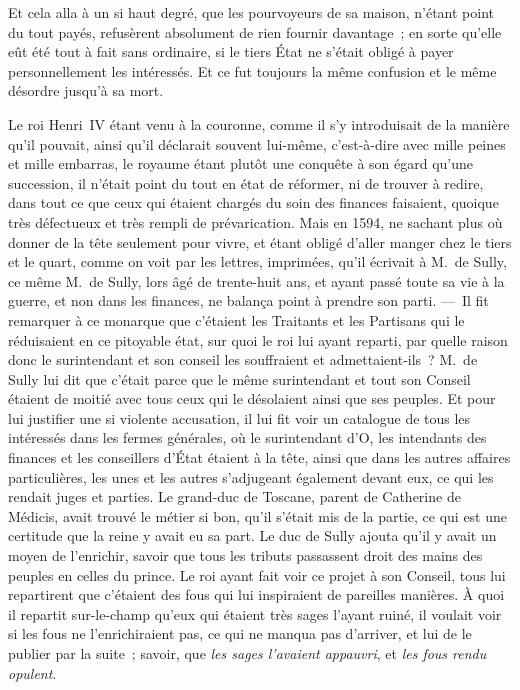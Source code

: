 \documentclass[french,twoside]{book} %
\begin{document}
Et cela alla à un si haut degré, que les pourvoyeurs de sa maison, n’étant point du tout payés, refusèrent absolument de rien fournir davantage ; en sorte qu’elle eût été tout à fait sans ordinaire, si le tiers État ne s’était obligé à payer personnellement les intéressés. Et ce fut toujours la même confusion et le même désordre jusqu’à sa mort.\par
Le roi Henri IV étant venu à la couronne, comme il s’y introduisait de la manière qu’il pouvait, ainsi qu’il déclarait souvent lui-même, c’est-à-dire avec mille peines et mille embarras, le royaume étant plutôt une conquête à son égard qu’une succession, il n’était point du tout en état de réformer, ni de trouver à redire, dans tout ce que ceux qui étaient chargés du soin des finances faisaient, quoique très défectueux et très rempli de prévarication. Mais en 1594, ne sachant plus où donner de la tête seulement pour vivre, et étant obligé d’aller manger chez le tiers et le quart, comme on voit par les lettres, imprimées, qu’il écrivait à M. de Sully, ce même M. de Sully, lors âgé de trente-huit ans, et ayant passé toute sa vie à la guerre, et non dans les finances, ne balança point à prendre son parti. — Il fit remarquer à ce monarque que c’étaient les Traitants et les Partisans qui le réduisaient en ce pitoyable état, sur quoi le roi lui ayant reparti, par quelle raison donc le surintendant et son conseil les souffraient et admettaient-ils ? M. de Sully lui dit que c’était parce que le même surintendant et tout son Conseil étaient de moitié avec tous ceux qui le désolaient ainsi que ses peuples. Et pour lui justifier une si violente accusation, il lui fit voir un catalogue de tous les intéressés dans les fermes générales, où le surintendant d’O, les intendants des finances et les conseillers d’État étaient à la tête, ainsi que dans les autres affaires particulières, les unes et les autres s’adjugeant également devant eux, ce qui les rendait juges et parties. Le grand-duc de Toscane, parent de Catherine de Médicis, avait trouvé le métier si bon, qu’il s’était mis de la partie, ce qui est une certitude que la reine y avait eu sa part. Le duc de Sully ajouta qu’il y avait un moyen de l’enrichir, savoir que tous les tributs passassent droit des mains des peuples en celles du prince. Le roi ayant fait voir ce projet à son Conseil, tous lui repartirent que c’étaient des fous qui lui inspiraient de pareilles manières. À quoi il repartit sur-le-champ qu’eux qui étaient très sages l’ayant ruiné, il voulait voir si les fous ne l’enrichiraient pas, ce qui ne manqua pas d’arriver, et lui de le publier par la suite ; savoir, que {\itshape les sages l’avaient appauvri}, et {\itshape les fous rendu opulent}.\par
\end{document}
